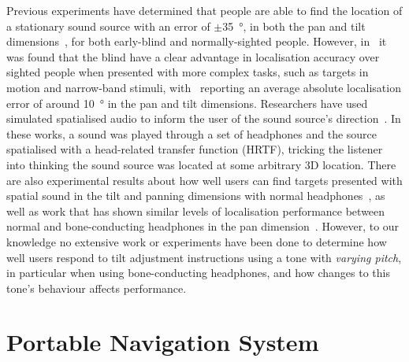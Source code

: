 \documentclass[sigconf, screen=true, anonymous=true]{acmart}
\begin{document}
Previous experiments have determined that people are able to find the location of a stationary sound source with an error of $\pm$\SI{35}{\degree}, in both the pan and tilt dimensions~\cite{zwiers2001spatial}, for both early-blind and normally-sighted people.
However, in~\cite{lewald2013exceptional, lessard1998early} it was found that the blind have a clear advantage in localisation accuracy over sighted people when presented with more complex tasks, such as targets in motion and narrow-band stimuli, with~\cite{lewald2013exceptional} reporting an average absolute localisation error of around \SI{10}{\degree} in the pan and tilt dimensions.
Researchers have used simulated spatialised audio to inform the user of the sound source's direction~\cite{holland2002audiogps, kammoun2012navigation, rebillat2009smart, menelas2010audio, wilson2007swan, zotkin2004rendering}.
In these works, a sound was played through a set of headphones and the source spatialised with a head-related transfer function (HRTF), tricking the listener into thinking the sound source was located at some arbitrary 3D location.
There are also experimental results about how well users can find targets presented with spatial sound in the tilt and panning dimensions with normal headphones~\cite{katz2011spatial, zwiers2001spatial}, as well as work that has shown similar levels of localisation performance between normal and bone-conducting headphones in the pan dimension~\cite{macdonald2006spatial}.
However, to our knowledge no extensive work or experiments have been done to determine how well users respond to tilt adjustment instructions using a tone with \textit{varying pitch}, in particular when using bone-conducting headphones, and how changes to this tone's behaviour affects performance. 

\section{Portable Navigation System}\label{sec:portable-navigation}
\end{document}
